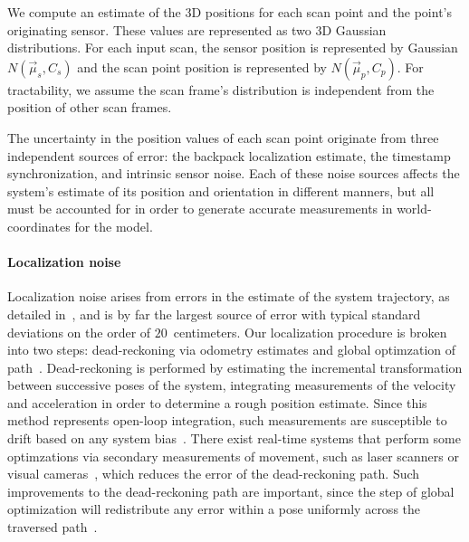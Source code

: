 \documentclass[12pt,onecolumn,oneside]{book}
\begin{document}
We compute an estimate of the 3D positions for each scan point and the point's originating sensor.  These values are represented as two 3D Gaussian distributions.  For each input scan, the sensor position is represented by Gaussian $N(\vec{\mu}_s,C_s)$ and the scan point position is represented by $N(\vec{\mu}_p,C_p)$.  For tractability, we assume the scan frame's distribution is independent from the position of other scan frames.

The uncertainty in the position values of each scan point originate from three independent sources of error: the backpack localization estimate, the timestamp synchronization, and intrinsic sensor noise.  Each of these noise sources affects the system's estimate of its position and orientation in different manners, but all must be accounted for in order to generate accurate measurements in world-coordinates for the model.

\paragraph*{Localization noise}
Localization noise arises from errors in the estimate of the system trajectory, as detailed in~\cite{NickJournal}, and is by far the largest source of error with typical standard deviations on the order of $20$~centimeters.  Our localization procedure is broken into two steps: dead-reckoning via odometry estimates and global optimzation of path~\cite{toro05,fastslam03}.  Dead-reckoning is performed by estimating the incremental transformation between successive poses of the system, integrating measurements of the velocity and acceleration in order to determine a rough position estimate.  Since this method represents open-loop integration, such measurements are susceptible to drift based on any system bias~\cite{Backpack,ProbabilisticRobotics}.  There exist real-time systems that perform some optimzations via secondary measurements of movement, such as laser scanners or visual cameras~\cite{Shelley14}, which reduces the error of the dead-reckoning path.  Such improvements to the dead-reckoning path are important, since the step of global optimization will redistribute any error within a pose uniformly across the traversed path~\cite{toro07}.
\end{document}
